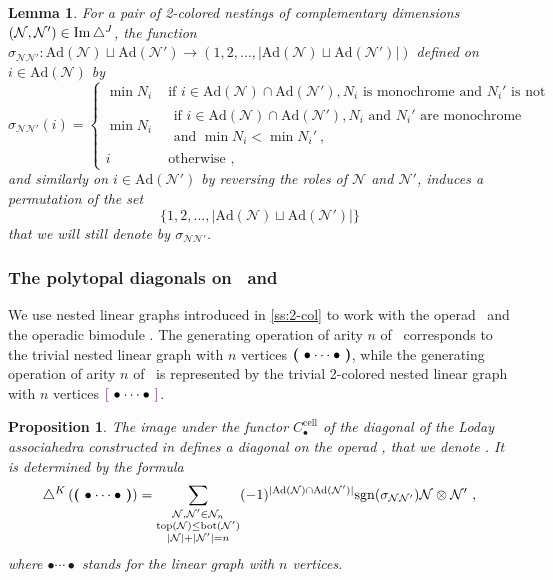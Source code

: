 \documentclass[10pt]{amsart}
\newtheorem{proposition}[definition]{Proposition}
\newtheorem{lemma}[definition]{Lemma}
\theoremstyle{remark}
\begin{document}
\begin{lemma} 
\label{prop:signs-mul}
For a pair of 2-colored nestings of complementary dimensions $(\mathcal{N},\mathcal{N}')\in \operatorname{Im}\triangle^J$, the function $\sigma_{\mathcal{N}\mathcal{N}'}: \mathrm{Ad}(\mathcal{N})\sqcup \mathrm{Ad}(\mathcal{N}') \to (1,2,\ldots,|\mathrm{Ad}(\mathcal{N})\sqcup \mathrm{Ad}(\mathcal{N}')|)$ defined on $i \in \mathrm{Ad}(\mathcal{N})$ by
\begin{equation*}
  \sigma_{\mathcal{N}\mathcal{N}'}(i)= 
  \begin{cases}
    \min N_i & \text{ if } i \in \mathrm{Ad}(\mathcal{N})\cap \mathrm{Ad}(\mathcal{N}') , N_i \text{ is monochrome and } N_i' \text{ is not} \\
    \min N_i & \begin{array}{l}
         \text{ if } i \in \mathrm{Ad}(\mathcal{N})\cap \mathrm{Ad}(\mathcal{N}'), N_i \text{ and } N_i' \text{ are monochrome} \\
         \text{ and } \min N_i < \min N_i' \ , 
    \end{array}   \\ 
    i & \text{ otherwise ,} 
  \end{cases}
\end{equation*}
and similarly on $i \in \mathrm{Ad}(\mathcal{N}')$ by reversing the roles of $\mathcal{N}$ and $\mathcal{N}'$, induces a permutation of the set $$\{1,2,\ldots,|\mathrm{Ad}(\mathcal{N})\sqcup \mathrm{Ad}(\mathcal{N}')|\}$$ that we will still denote by $\sigma_{\mathcal{N}\mathcal{N}'}$.
\end{lemma}


\subsubsection{The polytopal diagonals on \Ainf\ and \Minf}
\label{ss:diagonals}

We use nested linear graphs introduced in \cref{ss:2-col} to work with the operad \Ainf\ and the operadic bimodule \Minf . The generating operation of arity $n$ of \Ainf\ corresponds to the trivial nested linear graph with $n$ vertices $\boldsymbol{\left(\right.}  \bullet \cdots \bullet  \boldsymbol{\left.\right)}$, while the generating operation of arity $n$ of \Minf\ is represented by the trivial 2-colored nested linear graph with $n$ vertices $\purple{\bullet \cdots \bullet}$.

\begin{proposition}
\label{prop:diagonal-polytopale-a-infini}
The image under the functor $C_\bullet^{\mathrm{cell}}$ of the diagonal of the Loday associahedra constructed in \cite{MTTV19} defines a diagonal on the operad \Ainf , that we denote \diagainf . It is determined by the formula 
\[ \triangle^{K} \left( \boldsymbol{\left(\right.}  \bullet \cdots \bullet  \boldsymbol{\left.\right)} \right) = 
\sum_{\substack{
  \mathcal{N},\mathcal{N}' \in \mathcal{N}_n \\ 
  \operatorname{top}(\mathcal{N}) \leq \operatorname{bot}(\mathcal{N'}) \\
  |\mathcal{N}|+|\mathcal{N}'|=n
}}
(-1)^{|\mathrm{Ad}(\mathcal{N})\cap \mathrm{Ad}(\mathcal{N}')|}\mathrm{sgn}(\sigma_{\mathcal{N}\mathcal{N}'})\mathcal{N} \otimes \mathcal{N}' \ , \] 
where $\bullet \cdots \bullet$ stands for the linear graph with $n$ vertices. 
\end{proposition}
\end{document}

